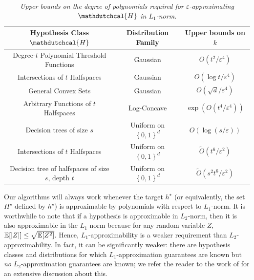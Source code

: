 \documentclass[11pt]{article}
\theoremstyle{plain}
\theoremstyle{definition}
\theoremstyle{remark}
\def\abs#1{\left| #1 \right|}
\newcommand{\sinparen}[1]{(#1)}
\newcommand{\inbrace}[1]{\left\{#1\right\}}
\newcommand{\E}{\operatornamewithlimits{\mathbb{E}}}
\newcommand{\Ex}{\E}
\newcommand{\zo}{\ensuremath{\inbrace{0, 1}}}
\newcommand{\eps}{\varepsilon}
\renewcommand{\tilde}{\widetilde}
\newcommand{\hypo}[1]{\mathdutchcal{#1}}
\newcommand{\hyH}{\hypo{H}}
\newcommand{\optset}{{H^\star}}
\renewcommand{\tilde}{\widetilde}
\newcommand{\nL}{L}
\begin{document}
            \begin{table}[ht!]
            \centering
            \begin{tabular}{c c c}
             Hypothesis Class $\hyH$
                & Distribution Family & 
                    Upper bounds on $k$ \\
            \midrule
            Degree-$t$ Polynomial Threshold Functions  \cite{kane2011gsa} &
                Gaussian & 
                        $O(t^2/{\eps^4})$ \\
            Intersections of $t$ Halfspaces \cite{kalai2008agnostically} & 
                    Gaussian  & 
                        $O({\log t}/{\eps^4})$\\
            General Convex Sets \cite{ball1993gsaConvexSets} &
                 Gaussian & 
                    $O(\sqrt{d}/{\eps^4})$ \\
            \hline
            Arbitrary Functions of $t$ Halfspaces \cite{kane2013learning}
                & Log-Concave & {$\exp\sinparen{O\sinparen{t^4/\eps^4}}$}\\
            \hline
            Decision trees of size $s$
            \cite{klivans2023testable} 
                & Uniform on $\zo^d$ 
                    & ${O}(\log(s/\eps))$ \\
            Intersections of $t$ Halfspaces 
            \cite{gopalan_2010_fooling}
                & Uniform on $\zo^d$ 
                    & $\tilde{O}(t^6/\eps^2)$ \\
            Decision tree of halfspaces of size $s$, depth $t$
            \cite{gopalan_2010_fooling}
                & Uniform on $\zo^d$ 
                    & $\tilde{O}(s^2 t^6/\eps^2)$ \\
            \end{tabular}
            
                \caption{
                    \textit{
                        Upper bounds on the degree of polynomials required for $\eps$-approximating $\hyH$ in $\nL_1$-norm.
                    }
                }
                \label{tab:gsa:GaussianSurfaceArea}
        \end{table} 
        
            \noindent Our algorithms will always work whenever the target $h^\star$ (or equivalently, the set $\optset$ defined by $h^\star$) is approximable by polynomials with respect to  $\nL_1$-norm.
            It is worthwhile to note that if a hypothesis is approximable in $\nL_2$-norm, then it is also approximable in the $\nL_1$-norm because for any random variable $Z$, $\Ex[\abs{Z}]\leq \sqrt{\Ex[Z^2]}$.
            Hence, $\nL_1$-approximability is a weaker requirement than $\nL_2$-approximability.
            In fact, it can be significantly weaker: there are hypothesis classes and distributions for which $\nL_1$-approximation guarantees are known but \textit{no} $\nL_2$-approximation guarantees are known; we refer the reader to the work of \citet{kane2013learning} for an extensive discussion about this.
 
\end{document}
